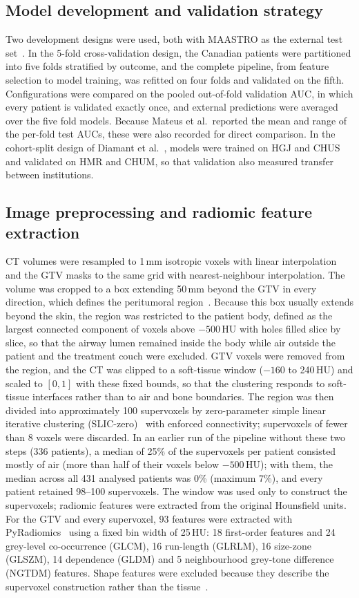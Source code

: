 \documentclass[11pt,a4paper]{article}
\begin{document}
\subsection{Model development and validation strategy}
Two development designs were used, both with MAASTRO as the external test set~\cite{mateus2023}. In the 5-fold cross-validation design, the Canadian patients were partitioned into five folds stratified by outcome, and the complete pipeline, from feature selection to model training, was refitted on four folds and validated on the fifth. Configurations were compared on the pooled out-of-fold validation AUC, in which every patient is validated exactly once, and external predictions were averaged over the five fold models. Because Mateus et al.\ reported the mean and range of the per-fold test AUCs, these were also recorded for direct comparison. In the cohort-split design of Diamant et al.~\cite{diamant2019}, models were trained on HGJ and CHUS and validated on HMR and CHUM, so that validation also measured transfer between institutions.

\subsection{Image preprocessing and radiomic feature extraction}
CT volumes were resampled to 1\,mm isotropic voxels with linear interpolation and the GTV masks to the same grid with nearest-neighbour interpolation. The volume was cropped to a box extending 50\,mm beyond the GTV in every direction, which defines the peritumoral region~\cite{bae2025spatial}. Because this box usually extends beyond the skin, the region was restricted to the patient body, defined as the largest connected component of voxels above $-500$\,HU with holes filled slice by slice, so that the airway lumen remained inside the body while air outside the patient and the treatment couch were excluded. GTV voxels were removed from the region, and the CT was clipped to a soft-tissue window ($-160$ to 240\,HU) and scaled to $[0,1]$ with these fixed bounds, so that the clustering responds to soft-tissue interfaces rather than to air and bone boundaries. The region was then divided into approximately 100 supervoxels by zero-parameter simple linear iterative clustering (SLIC-zero)~\cite{achanta2012slic} with enforced connectivity; supervoxels of fewer than 8 voxels were discarded. In an earlier run of the pipeline without these two steps (336 patients), a median of 25\% of the supervoxels per patient consisted mostly of air (more than half of their voxels below $-500$\,HU); with them, the median across all 431 analysed patients was 0\% (maximum 7\%), and every patient retained 98--100 supervoxels. The window was used only to construct the supervoxels; radiomic features were extracted from the original Hounsfield units. For the GTV and every supervoxel, 93 features were extracted with PyRadiomics~\cite{vangriethuysen2017} using a fixed bin width of 25\,HU: 18 first-order features and 24 grey-level co-occurrence (GLCM), 16 run-length (GLRLM), 16 size-zone (GLSZM), 14 dependence (GLDM) and 5 neighbourhood grey-tone difference (NGTDM) features. Shape features were excluded because they describe the supervoxel construction rather than the tissue~\cite{bae2025spatial}.
\end{document}
